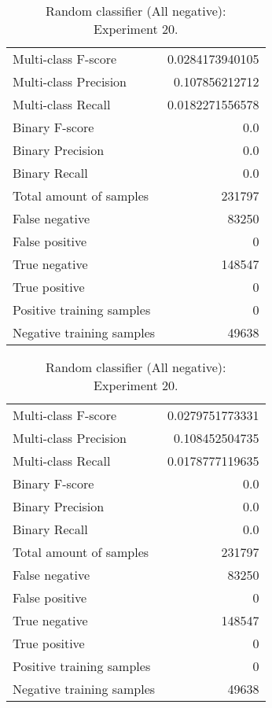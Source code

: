 \begin{table}[H]
\begin{minipage}{0.5\textwidth}
\caption{Random classifier (All negative): \\Experiment 19.}
\centering
\begin{tabular}{l r}
\toprule
Multi-class F-score & 0.0284173940105 \\
Multi-class Precision & 0.107856212712 \\
Multi-class Recall & 0.0182271556578 \\
\midrule
Binary F-score & 0.0 \\
Binary Precision & 0.0 \\
Binary Recall & 0.0 \\
\midrule
Total amount of samples & 231797 \\
False negative & 83250 \\
False positive & 0 \\
True negative & 148547 \\
True positive & 0 \\
\midrule
Positive training samples & 0 \\
Negative training samples & 49638 \\
\bottomrule
\end{tabular}
\end{minipage}
\hfillx
\begin{minipage}{0.5\textwidth}
\caption{Random classifier (All negative): \\Experiment 20.}
\centering
\begin{tabular}{l r}
\toprule
Multi-class F-score & 0.0279751773331 \\
Multi-class Precision & 0.108452504735 \\
Multi-class Recall & 0.0178777119635 \\
\midrule
Binary F-score & 0.0 \\
Binary Precision & 0.0 \\
Binary Recall & 0.0 \\
\midrule
Total amount of samples & 231797 \\
False negative & 83250 \\
False positive & 0 \\
True negative & 148547 \\
True positive & 0 \\
\midrule
Positive training samples & 0 \\
Negative training samples & 49638 \\
\bottomrule
\end{tabular}
\end{minipage}
\end{table}
